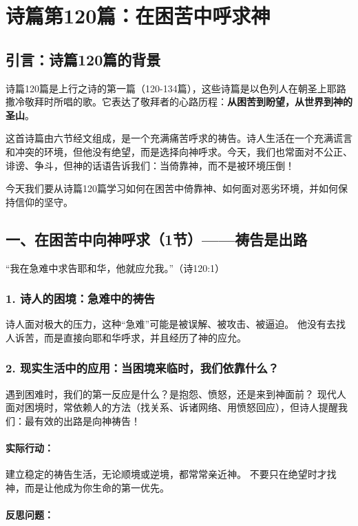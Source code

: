 \documentclass[a4paper, 12pt]{article}
\begin{document}
\section{诗篇第120篇：在困苦中呼求神}


\subsection*{引言：诗篇120篇的背景}
\hspace{0.6cm}诗篇120篇是上行之诗的第一篇（120-134篇），这些诗篇是以色列人在朝圣上耶路撒冷敬拜时所唱的歌。它表达了敬拜者的心路历程：\textbf{从困苦到盼望，从世界到神的圣山}。

这首诗篇由六节经文组成，是一个充满痛苦呼求的祷告。诗人生活在一个充满谎言和冲突的环境，但他没有绝望，而是选择向神呼求。今天，我们也常面对不公正、诽谤、争斗，但神的话语告诉我们：当倚靠神，而不是被环境压倒！

今天我们要从诗篇120篇学习如何在困苦中倚靠神、如何面对恶劣环境，并如何保持信仰的坚守。

\subsection*{一、在困苦中向神呼求（1节）——祷告是出路}
“我在急难中求告耶和华，他就应允我。”（诗120:1）

\subsubsection*{1. 诗人的困境：急难中的祷告}
诗人面对极大的压力，这种“急难”可能是被误解、被攻击、被逼迫。
他没有去找人诉苦，而是直接向耶和华呼求，并且经历了神的应允。
\subsubsection*{2. 现实生活中的应用：当困境来临时，我们依靠什么？}
遇到困难时，我们的第一反应是什么？是抱怨、愤怒，还是来到神面前？
现代人面对困境时，常依赖人的方法（找关系、诉诸网络、用愤怒回应），但诗人提醒我们：最有效的出路是向神祷告！
\paragraph*{实际行动：}

建立稳定的祷告生活，无论顺境或逆境，都常常亲近神。
不要只在绝望时才找神，而是让他成为你生命的第一优先。
\paragraph*{反思问题：}
\end{document}

